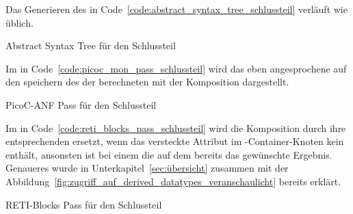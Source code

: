 Das Generieren des  in Code~\ref{code:abstract_syntax_tree_schlussteil} verläuft wie üblich.

\begin{code}
  \centering
  \caption{Abstract Syntax Tree für den Schlussteil}
  \label{code:abstract_syntax_tree_schlussteil}
\end{code}

Im  in Code~\ref{code:picoc_mon_pass_schlussteil} wird das eben angesprochene auf den  speichern des  der berechneten  mit der Komposition  dargestellt.

\begin{code}
  \centering
  \caption{PicoC-ANF Pass für den Schlussteil}
  \label{code:picoc_mon_pass_schlussteil}
\end{code}

Im  in Code~\ref{code:reti_blocks_pass_schlussteil} wird die Komposition  durch ihre entsprechenden  ersetzt, wenn das \textcolor{gray!90!black}{versteckte Attribut}  im -Container-Knoten kein   enthält, ansonsten ist bei einem  die  auf dem  bereits das gewünschte Ergebnis. Genaueres wurde in Unterkapitel~\ref{sec:übersicht} zusammen mit der Abbildung~\ref{fig:zugriff_auf_derived_datatypes_veranschaulicht} bereits erklärt.

\begin{code}
  \centering
  \caption{RETI-Blocks Pass für den Schlussteil}
  \label{code:reti_blocks_pass_schlussteil}
\end{code}

